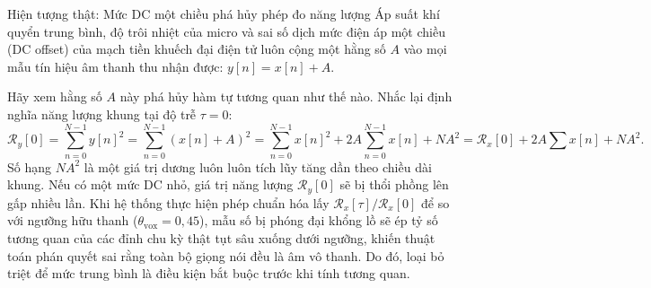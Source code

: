 \begin{firstprin}{Hiện tượng thật: Mức DC một chiều phá hủy phép đo năng lượng}
Áp suất khí quyển trung bình, độ trôi nhiệt của micro và sai số dịch mức điện áp một chiều (DC offset) của mạch tiền khuếch đại điện tử luôn cộng một hằng số $A$ vào mọi mẫu tín hiệu âm thanh thu nhận được: $y[n] = x[n] + A$.

Hãy xem hằng số $A$ này phá hủy hàm tự tương quan như thế nào. Nhắc lại định nghĩa năng lượng khung tại độ trễ $\tau = 0$:
\[
\mathcal{R}_y[0] = \sum_{n=0}^{N-1} y[n]^2 = \sum_{n=0}^{N-1} (x[n] + A)^2 = \sum_{n=0}^{N-1} x[n]^2 + 2A \sum_{n=0}^{N-1} x[n] + N A^2 = \mathcal{R}_x[0] + 2A \sum x[n] + N A^2.
\]
Số hạng $N A^2$ là một giá trị dương luôn luôn tích lũy tăng dần theo chiều dài khung. Nếu có một mức DC nhỏ, giá trị năng lượng $\mathcal{R}_y[0]$ sẽ bị thổi phồng lên gấp nhiều lần. Khi hệ thống thực hiện phép chuẩn hóa lấy $\mathcal{R}_x[\tau] / \mathcal{R}_x[0]$ để so với ngưỡng hữu thanh ($\theta_{\mathrm{vox}} = 0{,}45$), mẫu số bị phóng đại khổng lồ sẽ ép tỷ số tương quan của các đỉnh chu kỳ thật tụt sâu xuống dưới ngưỡng, khiến thuật toán phán quyết sai rằng toàn bộ giọng nói đều là âm vô thanh. Do đó, loại bỏ triệt để mức trung bình là điều kiện bắt buộc trước khi tính tương quan.
\end{firstprin}

